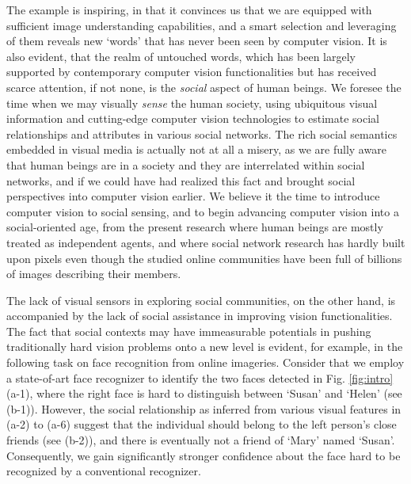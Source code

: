 The example is inspiring, in that it convinces us that we are equipped with sufficient image understanding capabilities, and a smart selection and leveraging of them reveals new `words' that has never been seen by computer vision.  It is also evident, that the realm of untouched words, which has been largely supported by contemporary computer vision functionalities but has received scarce attention, if not none, is the \emph{social} aspect of human beings. We foresee the time when we may visually \emph{sense} the human society, using ubiquitous visual information and cutting-edge computer vision technologies to estimate social relationships and attributes in various social networks. The rich social semantics embedded in visual media is actually not at all a misery, as we are fully aware that human beings are in a society and they are interrelated within social networks, and if we could have had realized this fact and brought social perspectives into computer vision earlier. We believe it the time to introduce computer vision to social sensing, and to begin advancing computer vision into a social-oriented age, from the present research where human beings are mostly treated as independent agents, and where social network research has hardly built upon pixels even though the studied online communities have been full of billions of images describing their members.

The lack of visual sensors in exploring social communities, on the other hand, is accompanied by the lack of social assistance in improving vision functionalities.  The fact that social contexts may have immeasurable potentials in pushing traditionally hard vision problems onto a new level is evident, for example, in the following task on face recognition from online imageries. Consider that we employ a state-of-art face recognizer to identify the two faces detected in Fig. \ref{fig:intro} (a-1), where the right face is hard to distinguish between `Susan' and `Helen' (see (b-1)). However, the social relationship as inferred from various visual features in (a-2) to (a-6) suggest that the individual should belong to the left person's close friends (see (b-2)), and there is eventually not a friend of `Mary' named `Susan'. Consequently, we gain significantly stronger confidence about the face hard to be recognized by a conventional recognizer. 

